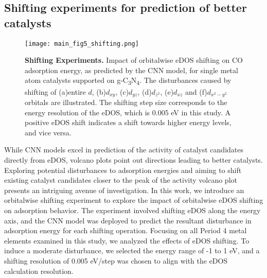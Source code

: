 
\subsection{Shifting experiments for prediction of better catalysts}

\begin{figure}[htbp]
    \centering
    \texttt{[image: main\_fig5\_shifting.png]}
    \caption{\textbf{Shifting Experiments.}
    Impact of orbitalwise eDOS shifting on CO adsorption energy, as predicted by the CNN model,
    for single metal atom catalysts supported on g-C\textsubscript{3}N\textsubscript{4}.
    The disturbances caused by shifting of (a)entire $d$, (b)$d_{xy}$, (c)$d_{yz}$,
    (d)$d_{z^2}$, (e)$d_{xz}$ and (f)$d_{x^2-y^2}$ orbitals are illustrated.
    The shifting step size corresponds to the energy resolution of the eDOS, which is 0.005 eV in this study.
    A positive eDOS shift indicates a shift towards higher energy levels, and vice versa.}
    \label{main_fig5:shifting}
\end{figure}

While CNN models excel in prediction of the activity of catalyst candidates directly from eDOS,
volcano plots point out directions leading to better catalysts.
Exploring potential disturbances to adsorption energies and aiming to shift existing catalyst
candidates closer to the peak of the activity volcano plot presents an intriguing avenue of investigation.
In this work, we introduce an orbitalwise shifting experiment to explore
the impact of orbitalwise eDOS shifting on adsorption behavior.
The experiment involved shifting eDOS along the energy axis,
and the CNN model was deployed to predict the resultant disturbance in adsorption energy for each shifting operation.
Focusing on all Period 4 metal elements examined in this study, we analyzed the effects of eDOS shifting.
To induce a moderate disturbance, we selected the energy range of -1 to 1 eV,
and a shifting resolution of 0.005 eV/step was chosen to align with the eDOS calculation resolution.

